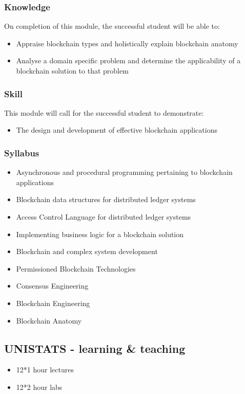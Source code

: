 \documentclass{MDXHandbook}
\begin{document}
{\subsubsection{Knowledge}
On completion of this module, the successful student will be able to:
\begin{itemize}
	\item Appraise blockchain types and holistically explain blockchain anatomy
	\item Analyse a domain specific problem and determine the applicability of a blockchain solution to that problem
\end{itemize}
\subsubsection{Skill}
This module will call for the successful student to demonstrate:

\begin{itemize}
	\item The design and development of effective blockchain applications
\end{itemize}

\subsubsection{Syllabus}
\begin{itemize}
	\item  Asynchronous and procedural programming pertaining to blockchain applications
    	\item  Blockchain data structures for distributed ledger systems
    	\item  Access Control Language for distributed ledger systems
    	\item  Implementing business logic for a blockchain solution 
    	\item  Blockchain and complex system development
    	\item  Permissioned Blockchain Technologies
    	\item  Consensus Engineering
    	\item  Blockchain Engineering
    	\item  Blockchain Anatomy
\end{itemize}

\subsection{UNISTATS - learning \& teaching }
\begin{itemize}
	\item 12*1 hour lectures
	\item 12*2 hour labs
\end{itemize}

}
\end{document}
